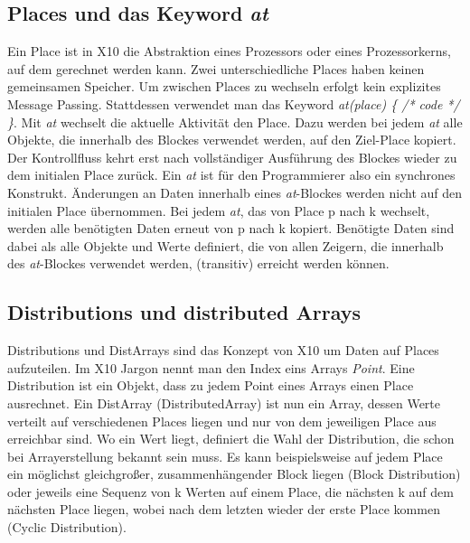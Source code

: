 \subsection{Places und das Keyword \textit{at}} %
\label{sub:places_und_das_keyword_at}
Ein Place ist in X10 die Abstraktion eines Prozessors oder eines Prozessorkerns, auf dem gerechnet werden kann. Zwei unterschiedliche Places haben keinen gemeinsamen Speicher. Um zwischen Places zu wechseln erfolgt kein explizites Message Passing. Stattdessen verwendet man das Keyword \textit{at(place) \{ /* code */ \}}. Mit \textit{at} wechselt die aktuelle Aktivität den Place. Dazu werden bei jedem \textit{at} alle Objekte, die innerhalb des Blockes verwendet werden, auf den Ziel-Place kopiert. Der Kontrollfluss kehrt erst nach vollständiger Ausführung des Blockes wieder zu dem initialen Place zurück. Ein \textit{at} ist für den Programmierer also ein synchrones Konstrukt. Änderungen an Daten innerhalb eines \textit{at}-Blockes werden nicht auf den initialen Place übernommen. Bei jedem \textit{at}, das von Place p nach k wechselt, werden alle benötigten Daten erneut von p nach k kopiert. Benötigte Daten sind dabei als alle Objekte und Werte definiert, die von allen Zeigern, die innerhalb des \textit{at}-Blockes verwendet werden, (transitiv) erreicht werden können.\cite{x10Spec:2012:Online}

\subsection{Distributions und distributed Arrays} %
\label{sub:distributions_und_distributed_arrays}
Distributions und DistArrays sind das Konzept von X10 um Daten auf Places aufzuteilen. Im X10 Jargon nennt man den Index eins Arrays \textit{Point}. Eine Distribution ist ein Objekt, dass zu jedem Point eines Arrays einen Place ausrechnet. Ein DistArray (DistributedArray) ist nun ein Array, dessen Werte verteilt auf verschiedenen Places liegen und nur von dem jeweiligen Place aus erreichbar sind. Wo ein Wert liegt, definiert die Wahl der Distribution, die schon bei Arrayerstellung bekannt sein muss. Es kann beispielsweise auf jedem Place ein möglichst gleichgroßer, zusammenhängender Block liegen (Block Distribution) oder jeweils eine Sequenz von k Werten auf einem Place, die nächsten k auf dem nächsten Place liegen, wobei nach dem letzten wieder der erste Place kommen (Cyclic Distribution).\cite{x10Spec:2012:Online}

